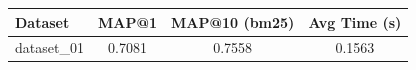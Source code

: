 \begin{tabular}{|l|c|c|c|}
\hline
Dataset & MAP@1 & MAP@10 (bm25) & Avg Time (s) \\ \hline
dataset_01 & 0.7081 & 0.7558 & 0.1563 \\ \hline
\end{tabular}
